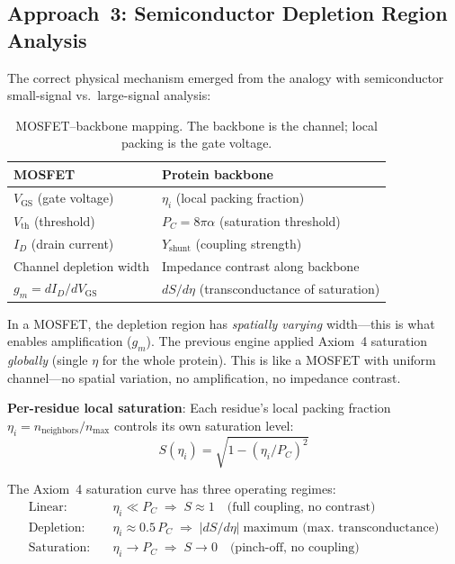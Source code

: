 \subsection{Approach~3: Semiconductor Depletion Region Analysis}
\label{sec:depletion_region}

The correct physical mechanism emerged from the analogy with semiconductor small-signal vs.\ large-signal analysis:

\begin{table}[H]
\centering
\caption{MOSFET--backbone mapping.  The backbone is the channel; local packing is the gate voltage.}
\label{tab:mosfet_mapping}
\begin{tabular}{@{}l l@{}}
\toprule
\textbf{MOSFET} & \textbf{Protein backbone} \\
\midrule
$V_\text{GS}$ (gate voltage)  & $\eta_i$ (local packing fraction) \\
$V_\text{th}$ (threshold)     & $P_C = 8\pi\alpha$ (saturation threshold) \\
$I_D$ (drain current)         & $Y_\text{shunt}$ (coupling strength) \\
Channel depletion width       & Impedance contrast along backbone \\
$g_m = dI_D/dV_\text{GS}$    & $dS/d\eta$ (transconductance of saturation) \\
\bottomrule
\end{tabular}
\end{table}

\noindent In a MOSFET, the depletion region has \emph{spatially varying} width---this is what enables amplification ($g_m$).  The previous engine applied Axiom~4 saturation \emph{globally} (single $\eta$ for the whole protein).  This is like a MOSFET with uniform channel---no spatial variation, no amplification, no impedance contrast.

\noindent \textbf{Per-residue local saturation}: Each residue's local packing fraction $\eta_i = n_\text{neighbors}/n_\text{max}$ controls its own saturation level:
\begin{equation}
    S(\eta_i) = \sqrt{1 - (\eta_i / P_C)^2}
\end{equation}

\noindent The Axiom~4 saturation curve has three operating regimes:
\begin{align}
    \text{Linear:}     \quad & \eta_i \ll P_C \;\Rightarrow\; S \approx 1 \quad\text{(full coupling, no contrast)} \\
    \text{Depletion:}  \quad & \eta_i \approx 0.5\,P_C \;\Rightarrow\; |dS/d\eta| \;\text{maximum (max.\ transconductance)} \\
    \text{Saturation:} \quad & \eta_i \to P_C \;\Rightarrow\; S \to 0 \quad\text{(pinch-off, no coupling)}
\end{align}

